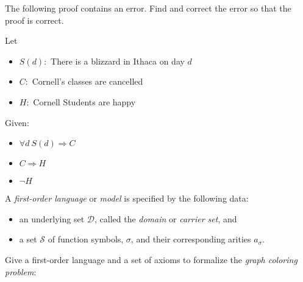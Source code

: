 \exercise{}

The following proof contains an error. Find and correct the error so
that the proof is correct.

Let
\begin{itemize}
  \item $S(d) : $ There is a blizzard in Ithaca on day $d$
  \item $C : $ Cornell's classes are cancelled
  \item $H : $ Cornell Students are happy
\end{itemize}

Given:
\begin{itemize}
  \item $\forall d\ S(d)\Rightarrow C$
  \item $C\Rightarrow H$
  \item $\neg H$
\end{itemize}

\begin{prooftree}
\end{prooftree}

\exercise{}

A \emph{first-order language} or \emph{model} is specified by the
following data:
\begin{itemize}
\item an underlying set $\mathcal{D}$, called the \emph{domain} or
  \emph{carrier set}, and
\item a set $\mathcal{S}$ of function symbols, $\sigma$, and their
  corresponding arities $a_\sigma$.
\end{itemize}

Give a first-order language and a set of axioms to formalize the
\emph{graph coloring problem}:

\setlength{\fboxsep}{10pt}
\setlength{\fboxrule}{0pt}
\begin{center}
\end{center}
